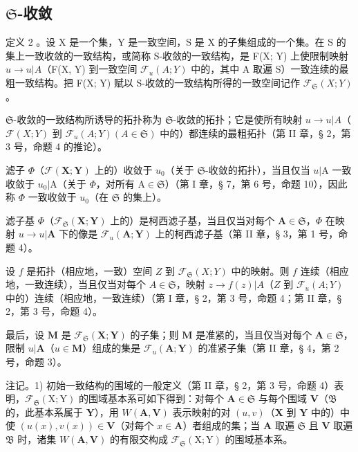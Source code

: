 \subsection{\texorpdfstring{\(\mathfrak{S}\)-收敛}{S-收敛}}

定义 2 。设 X 是一个集，Y 是一致空间，S 是 X 的子集组成的一个集。在 S 的集上一致收敛的一致结构，或简称 S-收敛的一致结构，是 F(X; Y) 上使限制映射 \(u \to u|A\)（F(X, Y) 到一致空间 \(\mathcal{F}_u(A; Y)\) 中的，其中 A 取遍 S）一致连续的最粗一致结构。把 F(X; Y) 赋以 S-收敛的一致结构所得的一致空间记作 \(\mathcal{F}_{\mathfrak{S}}(X; Y)\)。

\(\mathfrak{S}\)-收敛的一致结构所诱导的拓扑称为 \(\mathfrak{S}\)-收敛的拓扑；它是使所有映射 \(u \to u|A\)（\(\mathcal{F}(X; Y)\) 到 \(\mathcal{F}_u(A; Y) (A \in \mathfrak{S})\) 中的）都连续的最粗拓扑（第 II 章，§ 2，第 3 号，命题 4 的推论）。

滤子 \(\Phi\)（\(\mathcal{F}(\mathbf{X};\mathbf{Y})\) 上的）收敛于 \(u_{0}\)（关于 \(\mathfrak{S}\)-收敛的拓扑），当且仅当 \(u|\mathrm{A}\) 一致收敛于 \(u_{0}|\mathrm{A}\)（关于 \(\Phi\)，对所有 \(\mathrm{A}\in \mathfrak{S}\)）（第 I 章，§ 7，第 6 号，命题 10），因此称 \(\Phi\) 一致收敛于 \(u_{0}\)（在 \(\mathfrak{S}\) 的集上）。

滤子基 \(\Phi\)（\(\mathcal{F}_{\mathfrak{S}}(\mathbf{X};\mathbf{Y})\) 上的）是柯西滤子基，当且仅当对每个 \(\mathbf{A}\in\mathfrak{S}\)，\(\Phi\) 在映射 \(u\to u|\mathbf{A}\) 下的像是 \(\mathcal{F}_{u}(\mathbf{A};\mathbf{Y})\) 上的柯西滤子基（第 II 章，§ 3，第 1 号，命题 4）。

设 \(f\) 是拓扑（相应地，一致）空间 \(Z\) 到 \(\mathcal{F}_{\mathfrak{S}}(X; Y)\) 中的映射。则 \(f\) 连续（相应地，一致连续），当且仅当对每个 \(A \in \mathfrak{S}\)，映射 \(z \to f(z)|A\)（\(Z\) 到 \(\mathcal{F}_u(A; Y)\) 中的）连续（相应地，一致连续）（第 I 章，§ 2，第 3 号，命题 4；第 II 章，§ 2，第 3 号，命题 4）。

最后，设 \(\mathbf{M}\) 是 \(\mathcal{F}_{\mathfrak{S}}(\mathbf{X};\mathbf{Y})\) 的子集；则 \(\mathbf{M}\) 是准紧的，当且仅当对每个 \(\mathbf{A} \in \mathfrak{S}\)，限制 \(u|\mathbf{A}\)（\(u \in \mathbf{M}\)）组成的集是 \(\mathcal{F}_u(\mathbf{A};\mathbf{Y})\) 的准紧子集（第 II 章，§ 4，第 2 号，命题 3）。

注记。1) 初始一致结构的围域的一般定义（第 II 章，§ 2，第 3 号，命题 4）表明，\(\mathcal{F}_{\mathfrak{S}}(\mathrm{X};\mathrm{Y})\) 的围域基本系可如下得到：对每个 \(\mathbf{A}\in \mathfrak{S}\) 与每个围域 \(\mathbf{V}\)（\(\mathfrak{B}\) 的，此基本系属于 \(\mathbf{Y}\)），用 \(W(\mathbf{A},\mathbf{V})\) 表示映射的对 \((u,v)\)（\(\mathbf{X}\) 到 \(\mathbf{Y}\) 中的）中使 \((u(x),v(x))\in \mathbf{V}\)（对每个 \(x\in \mathbf{A}\)）者组成的集；当 \(\mathbf{A}\) 取遍 \(\mathfrak{S}\) 且 \(\mathbf{V}\) 取遍 \(\mathfrak{B}\) 时，诸集 \(W(\mathbf{A},\mathbf{V})\) 的有限交构成 \(\mathcal{F}_{\mathfrak{S}}(\mathrm{X};\mathrm{Y})\) 的围域基本系。

